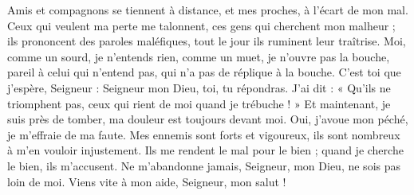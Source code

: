 Amis et compagnons se tiennent à distance, et mes proches, à l'écart de mon mal.
\versseparator
Ceux qui veulent ma perte me talonnent, ces gens qui cherchent mon malheur ; ils prononcent des paroles maléfiques, tout le jour ils ruminent leur traîtrise.
\versseparator
Moi, comme un sourd, je n'entends rien, comme un muet, je n'ouvre pas la bouche,
\versseparator
pareil à celui qui n'entend pas, qui n'a pas de réplique à la bouche.
\versseparator
C'est toi que j'espère, Seigneur : Seigneur mon Dieu, toi, tu répondras.
\versseparator
J'ai dit : « Qu'ils ne triomphent pas, ceux qui rient de moi quand je trébuche ! »
\versseparator
Et maintenant, je suis près de tomber, ma douleur est toujours devant moi.
\versseparator
Oui, j'avoue mon péché, je m'effraie de ma faute.
\versseparator
Mes ennemis sont forts et vigoureux, ils sont nombreux à m'en vouloir injustement.
\versseparator
Ils me rendent le mal pour le bien ; quand je cherche le bien, ils m'accusent.
\versseparator
Ne m'abandonne jamais, Seigneur, mon Dieu, ne sois pas loin de moi.
\versseparator
Viens vite à mon aide, Seigneur, mon salut !
